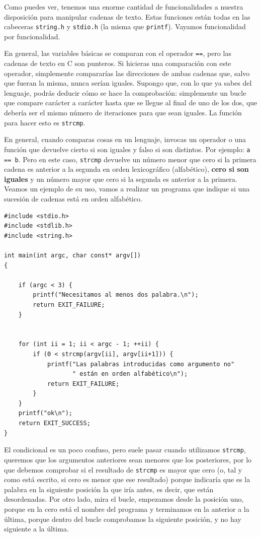 \documentclass[a4paper]{article}
\begin{document}
Como puedes ver, tenemos una enorme cantidad de funcionalidades a nuestra
disposición para manipular cadenas de texto. Estas funciones están todas en las
cabeceras \verb!string.h! y \verb!stdio.h! (la misma que \verb!printf!).
Vayamos funcionalidad por funcionalidad.

En general, las variables básicas se comparan con el operador \verb!==!, pero
las cadenas de texto en C son punteros. Si hicieras una comparación con este
operador, simplemente compararías las direcciones de ambas cadenas que, salvo
que fueran la misma, nunca serían iguales. Supongo que, con lo que ya sabes del
lenguaje, podrás deducir cómo se hace la comprobación: simplemente un bucle que
compare carácter a carácter hasta que se llegue al final de uno de los dos, que
debería ser el mismo número de iteraciones para que sean iguales. La función
para hacer esto es \verb!strcmp!.

En general, cuando comparas cosas en un lenguaje, invocas un operador o una
función que devuelve cierto si son iguales y falso si son distintos. Por
ejemplo: \verb!a == b!. Pero en este caso, \verb!strcmp! devuelve un número
menor que cero si la primera cadena es anterior a la segunda en orden
lexicográfico (alfabético), \textbf{cero si son iguales} y un número mayor
que cero si la segunda es anterior a la primera. Veamos un ejemplo de su uso,
vamos a realizar un programa que indique si una sucesión de cadenas está en
orden alfabético.

\noindent
\begin{minipage}[H]{\linewidth}
\mbox{}
\begin{lstlisting}[style=C,
caption={Ejemplo de uso de \texttt{strcmp}},
label={lst:strcmp}]
#include <stdio.h>
#include <stdlib.h>
#include <string.h>

int main(int argc, char const* argv[])
{

    if (argc < 3) {
        printf("Necesitamos al menos dos palabra.\n");
        return EXIT_FAILURE;
    }


    for (int ii = 1; ii < argc - 1; ++ii) {
        if (0 < strcmp(argv[ii], argv[ii+1])) {
            printf("Las palabras introducidas como argumento no"
                   " están en orden alfabético\n");
            return EXIT_FAILURE;
        }
    }
    printf("ok\n");
    return EXIT_SUCCESS;
}
\end{lstlisting}
\end{minipage}

El condicional es un poco confuso, pero suele pasar cuando utilizamos
\verb!strcmp!, queremos que los argumentos anteriores sean menores que los
posteriores, por lo que debemos comprobar si el resultado de \verb!strcmp! es
mayor que cero (o, tal y como está escrito, si cero es menor que ese resultado)
porque indicaría que es la palabra en la siguiente posición la que iría antes,
es decir, que están desordenadas. Por otro lado, mira el bucle, empezamos
desde la posición uno, porque en la cero está el nombre del programa y
terminamos en la anterior a la última, porque dentro del bucle comprobamos
la siguiente posición, y no hay siguiente a la última.
\end{document}

